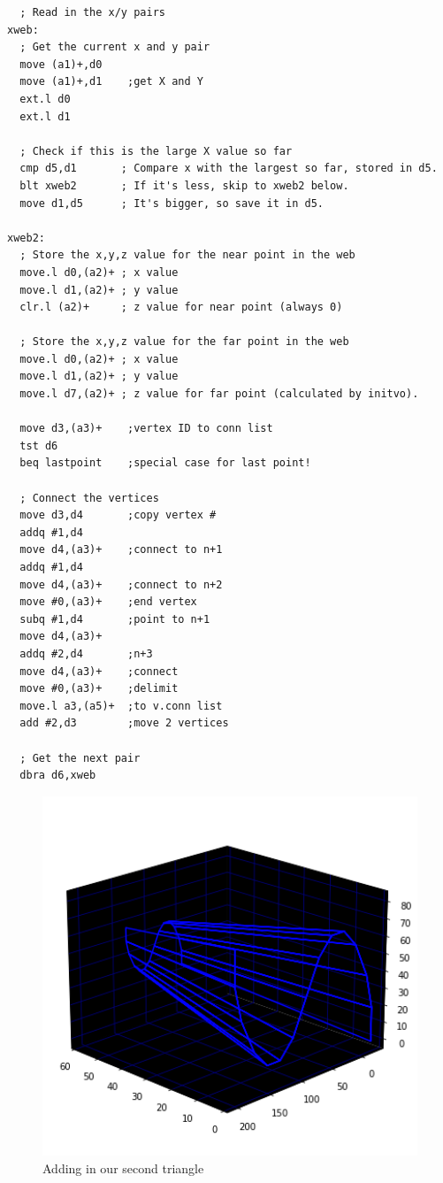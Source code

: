 \begin{lstlisting}
  ; Read in the x/y pairs
xweb:
  ; Get the current x and y pair
  move (a1)+,d0
  move (a1)+,d1    ;get X and Y
  ext.l d0
  ext.l d1

  ; Check if this is the large X value so far
  cmp d5,d1       ; Compare x with the largest so far, stored in d5. 
  blt xweb2       ; If it's less, skip to xweb2 below.
  move d1,d5      ; It's bigger, so save it in d5.

xweb2:
  ; Store the x,y,z value for the near point in the web
  move.l d0,(a2)+ ; x value
  move.l d1,(a2)+ ; y value
  clr.l (a2)+     ; z value for near point (always 0)

  ; Store the x,y,z value for the far point in the web
  move.l d0,(a2)+ ; x value
  move.l d1,(a2)+ ; y value
  move.l d7,(a2)+ ; z value for far point (calculated by initvo).

  move d3,(a3)+    ;vertex ID to conn list
  tst d6
  beq lastpoint    ;special case for last point!

  ; Connect the vertices
  move d3,d4       ;copy vertex #
  addq #1,d4
  move d4,(a3)+    ;connect to n+1
  addq #1,d4
  move d4,(a3)+    ;connect to n+2
  move #0,(a3)+    ;end vertex 
  subq #1,d4       ;point to n+1
  move d4,(a3)+
  addq #2,d4       ;n+3
  move d4,(a3)+    ;connect
  move #0,(a3)+    ;delimit
  move.l a3,(a5)+  ;to v.conn list
  add #2,d3        ;move 2 vertices

  ; Get the next pair
  dbra d6,xweb
\end{lstlisting}

\begin{figure}[H]
    \centering
    \begin{adjustbox}{width=9cm,center}
      \includegraphics[width=12cm]{src/webs/sine_wave_no_title.png}%
    \end{adjustbox}
  \caption{Adding in our second triangle}
\end{figure}

